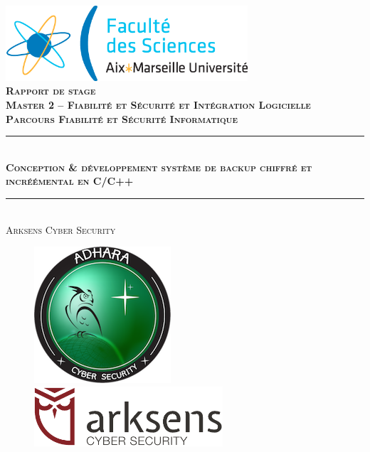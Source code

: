\documentclass[a4paper,10pt]{report}
\begin{document}
\begin{titlepage}
  \begin{center}
    \includegraphics[width=9cm]{images/logo_sciences.png}\\[2cm]
    
    \textsc{\bfseries\Large Rapport de stage\\[0.3cm]
    Master 2 -- Fiabilit\'e et S\'ecurit\'e et
    Int\'egration Logicielle\\[0.3cm]
        Parcours Fiabilit\'e et S\'ecurit\'e Informatique}\\[0.3cm]

    \rule{\linewidth}{1mm} \\[1cm]

    \textsc{\bfseries\huge Conception \&  d\'eveloppement syst\`eme de backup
    chiffr\'e et incr\'eémental en C/C++}\\[1cm]

    \rule{\linewidth}{1mm}\\[1.5cm]

    \textsc{\huge Arksens Cyber Security}\\[2cm]
    
    \begin{figure}[H]
      \begin{minipage}[t]{8cm}
        \centering
        \includegraphics[scale=0.50]{images/logo_adhara.png}
      \end{minipage}
      \begin{minipage}[t]{8cm}
        \centering
        \includegraphics[width=7cm]{images/logo_arksens.png}
      \end{minipage}\\[1.3cm]
    \end{figure}
      

\end{center}
\end{titlepage}
\end{document}
